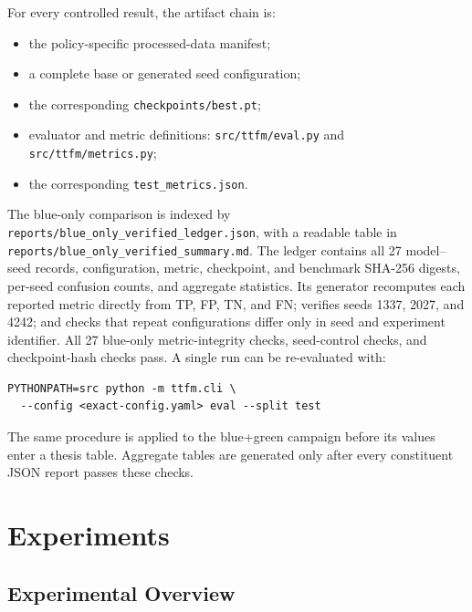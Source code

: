 \documentclass[12pt,a4paper]{report}
\begin{document}
For every controlled result, the artifact chain is:
\begin{itemize}[nosep]
  \item the policy-specific processed-data manifest;
  \item a complete base or generated seed configuration;
  \item the corresponding \texttt{checkpoints/best.pt};
  \item evaluator and metric definitions: \texttt{src/ttfm/eval.py} and
        \texttt{src/ttfm/metrics.py};
  \item the corresponding \texttt{test\_metrics.json}.
\end{itemize}
The blue-only comparison is indexed by
\texttt{reports/blue\_only\_verified\_ledger.json}, with a readable table in
\texttt{reports/blue\_only\_verified\_summary.md}. The ledger contains all 27
model--seed records, configuration, metric, checkpoint, and benchmark SHA-256
digests, per-seed confusion counts, and aggregate statistics. Its generator
recomputes each reported metric directly from TP, FP, TN, and FN; verifies
seeds 1337, 2027, and 4242; and checks that repeat configurations differ only
in seed and experiment identifier. All 27 blue-only metric-integrity checks,
seed-control checks, and checkpoint-hash checks pass. A single run can be
re-evaluated with:
\begin{verbatim}
PYTHONPATH=src python -m ttfm.cli \
  --config <exact-config.yaml> eval --split test
\end{verbatim}
The same procedure is applied to the blue+green campaign before its values
enter a thesis table. Aggregate tables are generated only after every
constituent JSON report passes these checks.


\chapter{Experiments}
\label{sec:experiments}

\section{Experimental Overview}
\end{document}
